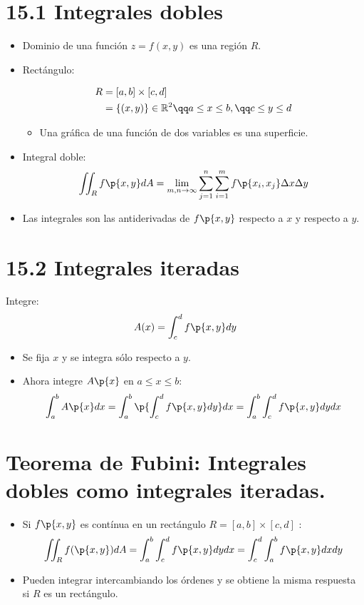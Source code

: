 \section{15.1 Integrales dobles}
\begin{itemize}
    \item Dominio de una función $z = f(x,y)$ es una región $R$.
    \item Rectángulo: 
        \begin{center}
           \begin{align*}
                R &= [a,b] \times [c,d] \\ 
                  &= \{(x,y)\} \in \mathbb{R}^2 \qq a \leq x \leq b, \qq c \leq y \leq d \\ 
           \end{align*}
           \begin{itemize}
               \item Una gráfica de una función de dos variables es una superficie. 
           \end{itemize}
        \end{center}
    
    \item Integral doble:
        \[
          \iint_{R}^{}f\p{x,y} dA = \lim_{m,n \to \infty} \sum_{j=1}^{n}\sum_{i=1}^{m} f\p{x_i,x_j} \Delta x \Delta y 
        \]
    
    \item Las integrales son las antiderivadas de $f\p{x,y} $ respecto a $x$ y respecto a $y$.
\end{itemize}


\section{15.2 Integrales iteradas}
Integre:
\[
  A(x) = \int_{c}^{d}f\p{x,y} dy
\]
\begin{itemize}
    \item Se fija $x$ y se integra sólo respecto a $y$. 
    \item Ahora integre $A\p{x} $ en $a\leq x \leq b$: 
        \[
          \int_{a}^{b} A\p{x} dx = \int_{a}^{b}\p{\int_{c}^{d}f\p{x,y} dy } dx = \int_{a}^{b}\int_{c}^{d} f\p{x,y} dy dx 
        \]
\end{itemize}

\section{Teorema de Fubini: Integrales dobles como integrales iteradas.}
\begin{itemize}
    \item Si $f\p{x,y} $ es contínua en un rectángulo $\displaystyle R = [a,b]\times [c,d]$ :
        \[
          \iint_{R}^{} f(\p{x,y} ) dA = \int_{a}^{b} \int_{c}^{d} f\p{x,y} dydx = \int_{c}^{d} \int_{a}^{b} f\p{x,y} dx dy
        \]
      
    \item Pueden integrar intercambiando los órdenes y se obtiene la misma respuesta si $R$ es un rectángulo.
\end{itemize}



